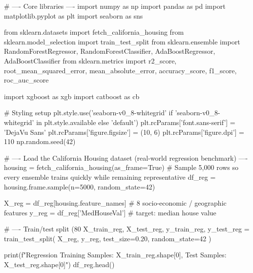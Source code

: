 
\begin{codebox}[title={Core libraries}]
# ---- Core libraries ----
import numpy as np
import pandas as pd
import matplotlib.pyplot as plt
import seaborn as sns

from sklearn.datasets import fetch_california_housing
from sklearn.model_selection import train_test_split
from sklearn.ensemble import RandomForestRegressor, RandomForestClassifier, AdaBoostRegressor, AdaBoostClassifier
from sklearn.metrics import r2_score, root_mean_squared_error, mean_absolute_error, accuracy_score, f1_score, roc_auc_score

import xgboost as xgb
import catboost as cb

# Styling setup
plt.style.use('seaborn-v0_8-whitegrid' if 'seaborn-v0_8-whitegrid' in plt.style.available else 'default')
plt.rcParams['font.sans-serif'] = 'DejaVu Sans'
plt.rcParams['figure.figsize'] = (10, 6)
plt.rcParams['figure.dpi'] = 110
np.random.seed(42)
\end{codebox}

\begin{codebox}[title={Load the California Housing dataset (real-world regression benchmark)}]
# ---- Load the California Housing dataset (real-world regression benchmark) ----
housing = fetch_california_housing(as_frame=True)
# Sample 5,000 rows so every ensemble trains quickly while remaining representative
df_reg = housing.frame.sample(n=5000, random_state=42)

X_reg = df_reg[housing.feature_names]   # 8 socio-economic / geographic features
y_reg = df_reg['MedHouseVal']           # target: median house value

# ---- Train/test split (80%
X_train_reg, X_test_reg, y_train_reg, y_test_reg = train_test_split(
    X_reg, y_reg, test_size=0.20, random_state=42
)

print(f"Regression Training Samples: {X_train_reg.shape[0]}, Test Samples: {X_test_reg.shape[0]}")
df_reg.head()
\end{codebox}

